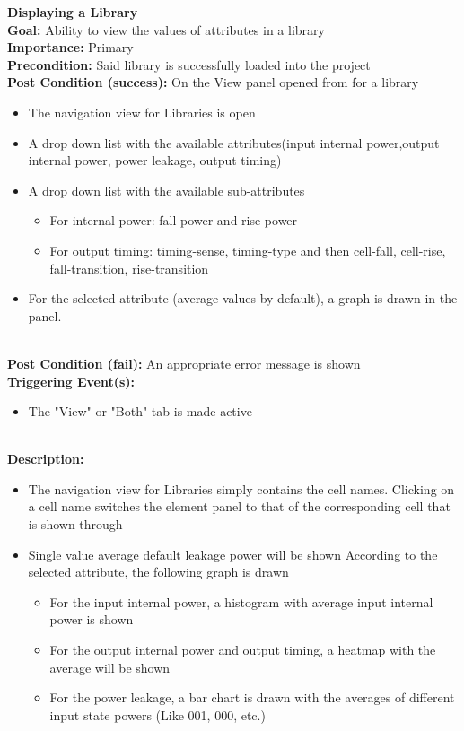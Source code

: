 \documentclass[10pt,a4paper]{report}
\newcommand{\precondition}[1]{
    \textbf{Precondition: } #1 \leavevmode \\
}
\newcommand{\FRDescription}[8]{
    \textbf{#1} \leavevmode \\
    \textbf{Goal: } #2 \leavevmode \\
    \textbf{Importance: } #3 \leavevmode \\
    \precondition{#4}
    \textbf{Post Condition (success): } #5 \leavevmode \\
    \textbf{Post Condition (fail): } #6 \leavevmode \\
    \textbf{Triggering Event(s): } #7 \leavevmode \\
    \textbf{Description: } \leavevmode \\ 
    #8}
\begin{document}
\begin{FR}
{\begin{itemize}
    \end{itemize}}
    \item \FRDescription{Displaying a Library}
    {Ability to view the values of attributes in a library}
    {Primary}
    {Said library is successfully loaded into the project}
    {On the View panel opened from \label{FR-PREVIOUS} for a library
        \begin{itemize}
            \item The navigation view for Libraries is open
            \item A drop down list with the available attributes(input internal power,output internal power, power leakage, output timing)
            \item A drop down list with the available sub-attributes
            \begin{itemize}
                \item For internal power: fall-power and rise-power
                \item For output timing: timing-sense, timing-type and then cell-fall, cell-rise, fall-transition, rise-transition
            \end{itemize}
            \item For the selected attribute (average values by default), a graph is drawn in the panel.
        \end{itemize}}
    {An appropriate error message is shown}
    {\begin{itemize}
        \item The "View" or "Both" tab is made active
    \end{itemize}}
    {\begin{itemize}
        \item The navigation view for Libraries simply contains the cell names. Clicking on a cell name switches the element panel to that of the corresponding cell that is shown through \label{FR-BLABLABLA}
        \item Single value average default leakage power will be shown
        According to the selected attribute, the following graph is drawn
        \begin{itemize}
            \item For the input internal power, a histogram with average input internal power is shown
            \item For the output internal power and output timing, a heatmap with the average will be shown
            \item For the power leakage, a bar chart is drawn with the averages of different input state powers (Like 001, 000, etc.)

\end{itemize}
\end{itemize}}
\end{FR}
\end{document}
